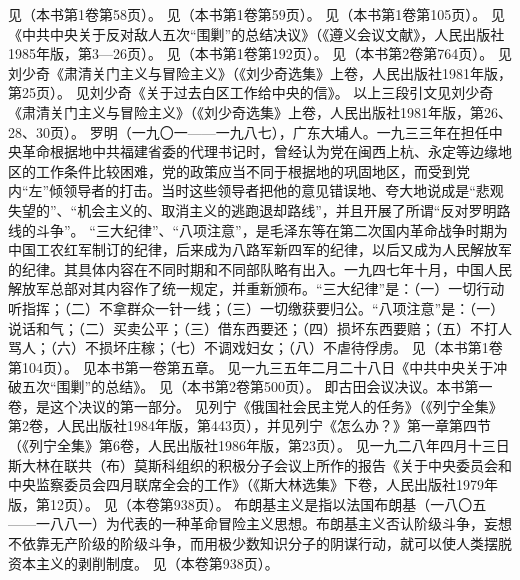 \begin{maonote}
见（本书第1卷第58页）。
见（本书第1卷第59页）。
见（本书第1卷第105页）。
见《中共中央关于反对敌人五次“围剿”的总结决议》（《遵义会议文献》，人民出版社1985年版，第3—26页）。
见（本书第1卷第192页）。
见（本书第2卷第764页）。
见刘少奇《肃清关门主义与冒险主义》（《刘少奇选集》上卷，人民出版社1981年版，第25页）。
见刘少奇《关于过去白区工作给中央的信》。
以上三段引文见刘少奇《肃清关门主义与冒险主义》（《刘少奇选集》上卷，人民出版社1981年版，第26、28、30页）。
罗明（一九〇一——一九八七），广东大埔人。一九三三年在担任中央革命根据地中共福建省委的代理书记时，曾经认为党在闽西上杭、永定等边缘地区的工作条件比较困难，党的政策应当不同于根据地的巩固地区，而受到党内“左”倾领导者的打击。当时这些领导者把他的意见错误地、夸大地说成是“悲观失望的”、“机会主义的、取消主义的逃跑退却路线”，并且开展了所谓“反对罗明路线的斗争”。
“三大纪律”、“八项注意”，是毛泽东等在第二次国内革命战争时期为中国工农红军制订的纪律，后来成为八路军新四军的纪律，以后又成为人民解放军的纪律。其具体内容在不同时期和不同部队略有出入。一九四七年十月，中国人民解放军总部对其内容作了统一规定，并重新颁布。“三大纪律”是：（一）一切行动听指挥；（二）不拿群众一针一线；（三）一切缴获要归公。“八项注意”是：（一）说话和气；（二）买卖公平；（三）借东西要还；（四）损坏东西要赔；（五）不打人骂人；（六）不损坏庄稼；（七）不调戏妇女；（八）不虐待俘虏。
见（本书第1卷第104页）。
见本书第一卷第五章。
见一九三五年二月二十八日《中共中央关于冲破五次“围剿”的总结》。
见（本书第2卷第500页）。
即古田会议决议。本书第一卷，是这个决议的第一部分。
见列宁《俄国社会民主党人的任务》（《列宁全集》第2卷，人民出版社1984年版，第443页），并见列宁《怎么办？》第一章第四节（《列宁全集》第6卷，人民出版社1986年版，第23页）。
见一九二八年四月十三日斯大林在联共（布）莫斯科组织的积极分子会议上所作的报告《关于中央委员会和中央监察委员会四月联席全会的工作》（《斯大林选集》下卷，人民出版社1979年版，第12页）。
见（本卷第938页）。
布朗基主义是指以法国布朗基（一八〇五——一八八一）为代表的一种革命冒险主义思想。布朗基主义否认阶级斗争，妄想不依靠无产阶级的阶级斗争，而用极少数知识分子的阴谋行动，就可以使人类摆脱资本主义的剥削制度。
见（本卷第938页）。
\end{maonote} 
